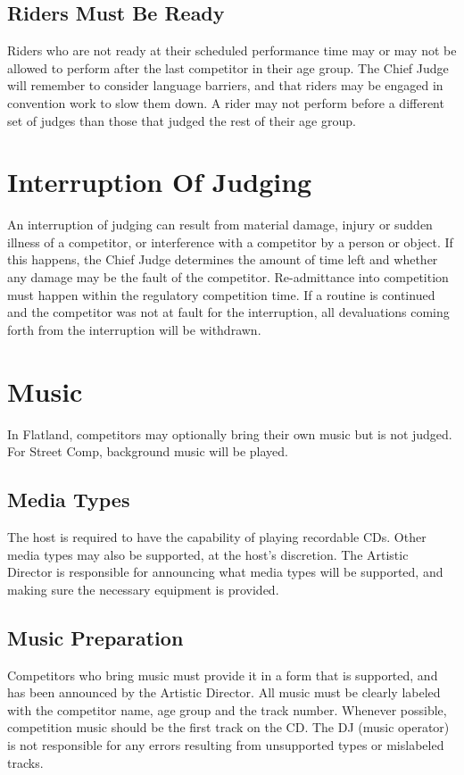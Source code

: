 \subsection{Riders Must Be Ready}
Riders who are not ready at their scheduled performance time may or may not be allowed to perform after the last competitor in their age group.
The Chief Judge will remember to consider language barriers, and that riders may be engaged in convention work to slow them down.
A rider may not perform before a different set of judges than those that judged the rest of their age group.

\section{Interruption Of Judging}
An interruption of judging can result from material damage, injury or sudden illness of a competitor, or interference with a competitor by a person or object.
If this happens, the Chief Judge determines the amount of time left and whether any damage may be the fault of the competitor.
Re-admittance into competition must happen within the regulatory competition time.
If a routine is continued and the competitor was not at fault for the interruption, all devaluations coming forth from the interruption will be withdrawn.

\section{Music}
In Flatland, competitors may optionally bring their own music but is not judged.
For Street Comp, background music will be played.

\subsection{Media Types}
The host is required to have the capability of playing recordable CDs.
Other media types may also be supported, at the host's discretion.
The Artistic Director is responsible for announcing what media types will be supported, and making sure the necessary equipment is provided.

\subsection{Music Preparation}
Competitors who bring music must provide it in a form that is supported, and has been announced by the Artistic Director.
All music must be clearly labeled with the competitor name, age group and the track number.
Whenever possible, competition music should be the first track on the CD.
The DJ (music operator) is not responsible for any errors resulting from unsupported types or mislabeled tracks.

